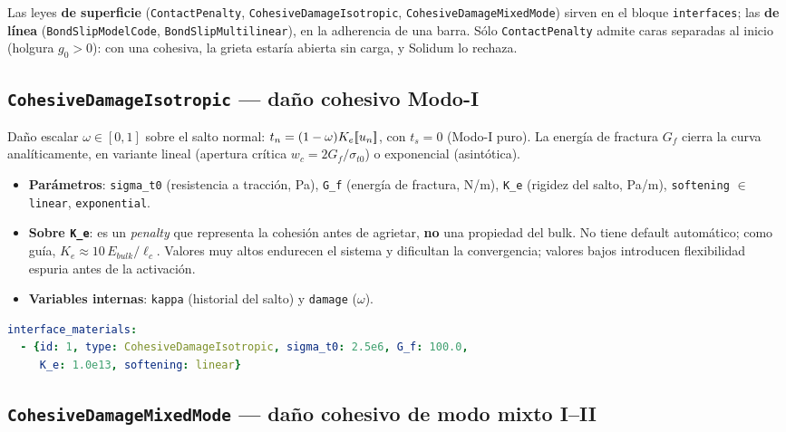 \documentclass[11pt,oneside]{report}
\providecommand{\llbracket}{\mathopen{[\mkern-3.2mu[}}
\providecommand{\rrbracket}{\mathclose{]\mkern-3.2mu]}}
\begin{document}
Las leyes \textbf{de superficie} (\texttt{ContactPenalty}, \texttt{CohesiveDamageIsotropic}, \texttt{CohesiveDamageMixedMode}) sirven en el bloque \texttt{interfaces}; las \textbf{de línea} (\texttt{BondSlipModelCode}, \texttt{BondSlipMultilinear}), en la adherencia de una barra. Sólo \texttt{ContactPenalty} admite caras separadas al inicio (holgura $g_0 > 0$): con una cohesiva, la grieta estaría abierta sin carga, y Solidum lo rechaza.

\subsection{\texttt{CohesiveDamageIsotropic} --- daño cohesivo Modo-I}

Daño escalar $\omega \in [0, 1]$ sobre el salto normal: $t_n = (1-\omega)K_e \llbracket u_n \rrbracket$, con $t_s = 0$ (Modo-I puro). La energía de fractura $G_f$ cierra la curva analíticamente, en variante lineal (apertura crítica $w_c = 2G_f/\sigma_{t0}$) o exponencial (asintótica).

\begin{itemize}
  \item \textbf{Parámetros}: \texttt{sigma\_t0} (resistencia a tracción, Pa), \texttt{G\_f} (energía de fractura, N/m), \texttt{K\_e} (rigidez del salto, Pa/m), \texttt{softening} $\in$ {\texttt{linear}, \texttt{exponential}}.
  \item \textbf{Sobre \texttt{K\_e}}: es un \textit{penalty} que representa la cohesión antes de agrietar, \textbf{no} una propiedad del bulk. No tiene default automático; como guía, $K_e \approx 10\,E_{bulk}/\ell_c$. Valores muy altos endurecen el sistema y dificultan la convergencia; valores bajos introducen flexibilidad espuria antes de la activación.
  \item \textbf{Variables internas}: \texttt{kappa} (historial del salto) y \texttt{damage} ($\omega$).
\end{itemize}

\begin{lstlisting}[language=yaml]
interface_materials:
  - {id: 1, type: CohesiveDamageIsotropic, sigma_t0: 2.5e6, G_f: 100.0,
     K_e: 1.0e13, softening: linear}

\end{lstlisting}

\subsection{\texttt{CohesiveDamageMixedMode} --- daño cohesivo de modo mixto I--II}
\end{document}

